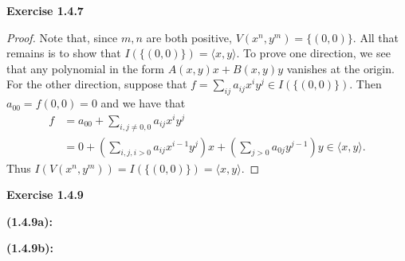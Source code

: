 \documentclass[12pt,oneside]{article}
\newenvironment{exercise}[1]{\vspace{.1in}\noindent\textbf{Exercise #1 \hspace{.05em}}}{}
\begin{document}
\begin{exercise}{1.4.7}
    \begin{proof}
        Note that, since $m,n$ are both positive, $V(x^n,y^m) = \{(0,0)\}$. All 
        that remains is to show that $I(\{(0,0)\}) = \langle x,y \rangle$. To 
        prove one direction, we see that any polynomial in the form $A(x,y)x +B(x,y)y$
        vanishes at the origin. For the other direction, suppose that 
        $f = \sum_{ij}a_{ij}x^iy^j \in I(\{(0,0)\})$. Then $a_{00} = f(0,0) = 0$ 
        and we have that 
        \begin{align*}
            f   &= a_{00} + \sum_{i,j \neq 0,0}a_{ij}x^iy^j\\
                &= 0 + (\sum_{i,j, i>0}a_{ij}x^{i-1}y^j)x + (\sum_{j>0}a_{0j}y^{j-1})y \in \langle x,y \rangle.
        \end{align*}
        Thus $I(V(x^n,y^m)) = I(\{(0,0)\}) = \langle x,y \rangle$.
    \end{proof}
\end{exercise}


\begin{exercise}{1.4.9}

    \bigskip
    \textbf{(1.4.9a):}

    \bigskip
    \textbf{(1.4.9b):}

\end{exercise}


\end{document}
